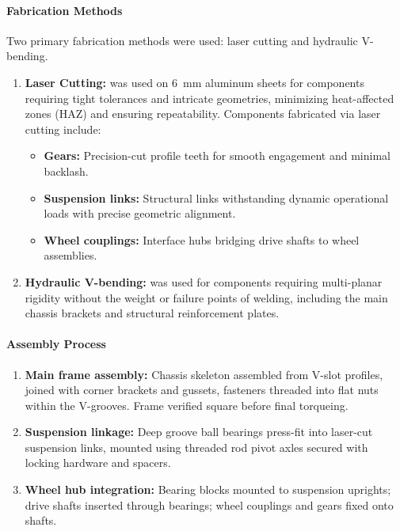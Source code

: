 \documentclass[12pt,a4paper,twocolumn]{article}
\begin{document}
\paragraph{Fabrication Methods}
Two primary fabrication methods were used: laser cutting and hydraulic V-bending.
\begin{enumerate}
    \item \textbf{Laser Cutting:} was  used on 6~mm aluminum sheets for components requiring tight tolerances and intricate geometries, minimizing heat-affected zones (HAZ) and ensuring repeatability. Components fabricated via laser cutting include:
\begin{itemize}
\item \textbf{Gears:} Precision-cut profile teeth for smooth engagement and minimal backlash.
\item \textbf{Suspension links:} Structural links withstanding dynamic operational loads with precise geometric alignment.
\item \textbf{Wheel couplings:} Interface hubs bridging drive shafts to wheel assemblies.
\end{itemize}
\item \textbf{Hydraulic V-bending:} was used for components requiring multi-planar rigidity without the weight or failure points of welding, including the main chassis brackets and structural reinforcement plates.
\end{enumerate}

\paragraph{Assembly Process}
\begin{enumerate}
\item \textbf{Main frame assembly:} Chassis skeleton assembled from V-slot profiles, joined with corner brackets and gussets, fasteners threaded into flat nuts within the V-grooves. Frame verified square before final torqueing.
\item \textbf{Suspension linkage:} Deep groove ball bearings press-fit into laser-cut suspension links, mounted using threaded rod pivot axles secured with locking hardware and spacers.
\item \textbf{Wheel hub integration:} Bearing blocks mounted to suspension uprights; drive shafts inserted through bearings; wheel couplings and gears fixed onto shafts.
\end{enumerate}
\end{document}
